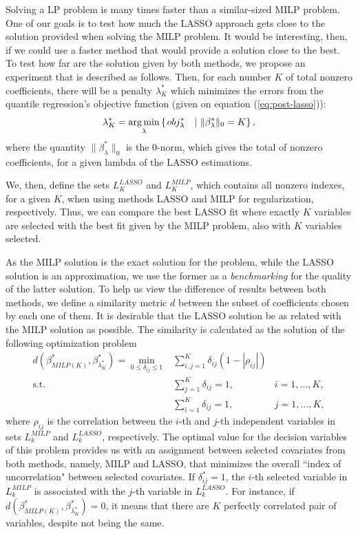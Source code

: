 
Solving a LP problem is many times faster than a similar-sized MILP problem. One of our goals is to test how much the LASSO approach gets close to the solution provided when solving the MILP problem. It would be interesting, then, if we could use a faster method that would provide a solution close to the best. To test how far are the solution given by both methods, we propose an experiment that is described as follows. Then, for each number $K$ of total nonzero coefficients, there will be a penalty $\lambda^*_K$ which minimizes the errors from the quantile regression's objective function (given on equation (\ref{eq:post-lasso})): 
\begin{equation}
\lambda^*_K = \operatorname*{arg\,min}_\lambda \left\lbrace \left.  obj_{\lambda}^{*} \quad  \right| \, \| \beta^*_\lambda \|_0 = K \right\rbrace,
\end{equation}
where the quantity $\| \beta^*_\lambda \|_0$ is the $0$-norm, which gives the total of nonzero coefficients, for a given lambda of the LASSO estimations.

We, then, define the sets $L_K^{LASSO}$ and $L_K^{MILP}$, which contains all nonzero indexes, for a given $K$, when using methods LASSO and MILP for regularization, respectively.
Thus, we can compare the best LASSO fit where exactly $K$ variables are selected with the best fit given by the MILP problem, also with $K$ variables selected.

As the MILP solution is the exact solution for the problem, while the LASSO solution is an approximation, we use the former as a \textit{benchmarking} for the quality of the latter solution. To help us view the difference of results between both methods, we define a similarity metric $d$ between the subset of coefficients chosen by each one of them. It is desirable that the LASSO solution be as related with the MILP solution as possible.
The similarity is calculated as the solution of the following optimization problem
\begin{eqnarray}
d(\beta^*_{MILP(K)}, \beta^*_{\lambda^*_K}) = \min_{0\leq\delta_{ij}\leq1} & \sum\limits_{i,j = 1}^K  \delta_{ij} (1-|\rho_{ij}|) \label{eq:metricad0} \\
\text{s.t.} & \sum\limits_{j =1}^K\delta_{ij}=1, &  i=1,\dots,K,\\
& \sum\limits_{i =1}^K\delta_{ij}=1, & j=1,\dots,K,
\end{eqnarray}
where $\rho_{ij}$ is the correlation between the $i$-th and $j$-th independent variables in sets $L_k^{MILP}$ and $L_k^{LASSO}$, respectively. The optimal value for the decision variables of this problem provides us with an assignment between selected covariates from both methods, namely, MILP and LASSO, that minimizes the overall ``index of uncorrelation" between selected covariates. If $\delta^*_{ij} = 1$, the $i$-th selected variable in  $L_k^{MILP}$ is associated with the $j$-th variable  in $L_k^{LASSO}$. For instance, if $d(\beta^*_{MILP(K)}, \beta^*_{\lambda^*_K}) = 0$, it means that there are $K$ perfectly correlated pair of variables, despite not being the same.

